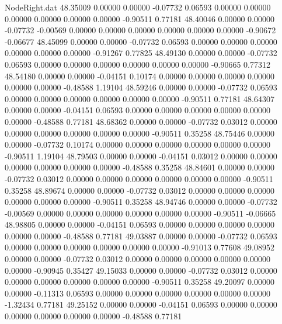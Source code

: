 \begin{filecontents}{NodeRight.dat}
  48.35009    0.00000    0.00000    -0.07732    0.06593    0.00000    0.00000    0.00000    0.00000    0.00000    0.00000   -0.90511    0.77181
  48.40046    0.00000    0.00000    -0.07732   -0.00569    0.00000    0.00000    0.00000    0.00000    0.00000    0.00000   -0.90672   -0.06677
  48.45099    0.00000    0.00000    -0.07732    0.06593    0.00000    0.00000    0.00000    0.00000    0.00000    0.00000   -0.91267    0.77825
  48.49130    0.00000    0.00000    -0.07732    0.06593    0.00000    0.00000    0.00000    0.00000    0.00000    0.00000   -0.90665    0.77312
  48.54180    0.00000    0.00000    -0.04151    0.10174    0.00000    0.00000    0.00000    0.00000    0.00000    0.00000   -0.48588    1.19104
  48.59246    0.00000    0.00000    -0.07732    0.06593    0.00000    0.00000    0.00000    0.00000    0.00000    0.00000   -0.90511    0.77181
  48.64307    0.00000    0.00000    -0.04151    0.06593    0.00000    0.00000    0.00000    0.00000    0.00000    0.00000   -0.48588    0.77181
  48.68362    0.00000    0.00000    -0.07732    0.03012    0.00000    0.00000    0.00000    0.00000    0.00000    0.00000   -0.90511    0.35258
  48.75446    0.00000    0.00000    -0.07732    0.10174    0.00000    0.00000    0.00000    0.00000    0.00000    0.00000   -0.90511    1.19104
  48.79503    0.00000    0.00000    -0.04151    0.03012    0.00000    0.00000    0.00000    0.00000    0.00000    0.00000   -0.48588    0.35258
  48.84601    0.00000    0.00000    -0.07732    0.03012    0.00000    0.00000    0.00000    0.00000    0.00000    0.00000   -0.90511    0.35258
  48.89674    0.00000    0.00000    -0.07732    0.03012    0.00000    0.00000    0.00000    0.00000    0.00000    0.00000   -0.90511    0.35258
  48.94746    0.00000    0.00000    -0.07732   -0.00569    0.00000    0.00000    0.00000    0.00000    0.00000    0.00000   -0.90511   -0.06665
  48.98805    0.00000    0.00000    -0.04151    0.06593    0.00000    0.00000    0.00000    0.00000    0.00000    0.00000   -0.48588    0.77181
  49.03887    0.00000    0.00000    -0.07732    0.06593    0.00000    0.00000    0.00000    0.00000    0.00000    0.00000   -0.91013    0.77608
  49.08952    0.00000    0.00000    -0.07732    0.03012    0.00000    0.00000    0.00000    0.00000    0.00000    0.00000   -0.90945    0.35427
  49.15033    0.00000    0.00000    -0.07732    0.03012    0.00000    0.00000    0.00000    0.00000    0.00000    0.00000   -0.90511    0.35258
  49.20097    0.00000    0.00000    -0.11313    0.06593    0.00000    0.00000    0.00000    0.00000    0.00000    0.00000   -1.32434    0.77181
  49.25152    0.00000    0.00000    -0.04151    0.06593    0.00000    0.00000    0.00000    0.00000    0.00000    0.00000   -0.48588    0.77181

\end{filecontents}
